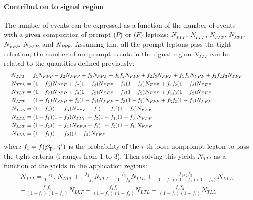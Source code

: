 \paragraph{Contribution to signal region\\}
The number of events can be expressed as a function of the number of events with a given composition of prompt ($P$) or \nonprompt ($F$) leptons:
$N_{FFF}$, $N_{FFP}$, $N_{FPF}$, $N_{PFF}$, $N_{FPP}$, $N_{PFP}$, and $N_{PPF}$.
Assuming that all the prompt leptons pass the tight selection, the number of nonprompt events in the signal region $N_{TTT}$ can be related to the quantities defined previously:
\begin{equation}
  \resizebox{\textwidth}{!}{
    $\begin{aligned}
      N_{TTT} &= f_1 N_{FPP} + f_2 N_{PFP}+f_3 N_{PPF}+f_1 f_2 N_{FFP}+f_2 f_3 N_{PFF}+f_1 f_3 N_{FPF}+f_1 f_2 f_3 N_{FFF}\\
      N_{TTL} &= (1-f_3) N_{PPF} + f_2(1-f_3) N_{PFF} + f_1(1-f_3) N_{FPF} + f_1 f_2(1-f_3) N_{FFF}\\
      N_{TLT} &= (1-f_2) N_{PFP} + f_3(1-f_2) N_{PFF} + f_1(1-f_2) N_{FFP} + f_1 f_3(1-f_2) N_{FFF}\\
      N_{LTT} &= (1-f_1) N_{FPP} + f_2(1-f_1) N_{FFP} + f_3(1-f_1) N_{FPF} + f_3 f_2(1-f_1) N_{FFF}\\
      N_{TLL} &= (1-f_2)(1-f_3) N_{PFF} + f_1(1-f_2)(1-f_3) N_{FFF}\\
      N_{LTL} &= (1-f_1)(1-f_3) N_{FPF} + f_2(1-f_1)(1-f_3) N_{FFF}\\
      N_{LLT} &= (1-f_2)(1-f_1) N_{FFP} + f_3(1-f_2)(1-f_1) N_{FFF}\\
      N_{LLL} &= (1-f_1)(1-f_2)(1-f_3) N_{FFF}
    \end{aligned}$
  }
\end{equation}
where $f_i = f(p_{\mathrm{T}}^{i},\, \eta^{i})$ is the probability of the $i$-th loose nonprompt lepton to pass the tight criteria (i ranges from 1 to 3).
Then solving this yields $N_{TTT}$ as a function of the yields in the application regions:
\begin{equation}
\begin{split}
N_{TTT} =
  \frac{f_1}{1-f_1} N_{LTT}
+ \frac{f_2}{1-f_2} N_{TLT}
+ \frac{f_3}{1-f_3} N_{TTL}
+ \frac{f_1 f_2 f_3}{(1-f_1)(1-f_2)(1-f_3)} N_{LLL}\\
- \frac{f_1 f_2}{(1-f_1)(1-f_2)} N_{LLT}
- \frac{f_1 f_3}{(1-f_1)(1-f_3)} N_{LTL}
- \frac{f_2 f_3}{(1-f_2)(1-f_3)} N_{TLL}
\end{split}
\end{equation}
